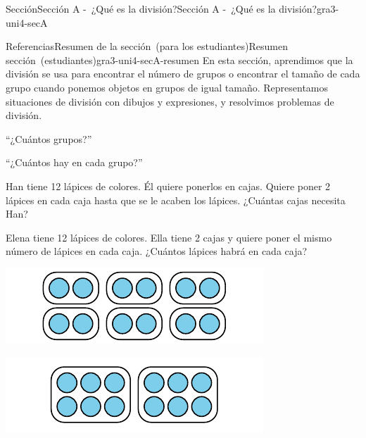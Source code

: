 \documentclass[oneside,10pt,]{article}
\begin{document}
\begin{sectionptx}{Sección}{Sección A -~¿Qué es la división?}{}{Sección A -~¿Qué es la división?}{}{}{gra3-uni4-secA}
\begin{references-subsection}{Referencias}{Resumen de la sección~(para los estudiantes)}{}{Resumen sección~(estudiantes)}{}{}{gra3-uni4-secA-resumen}
En esta sección, aprendimos que la división se usa para encontrar el número de grupos o encontrar el tamaño de cada grupo cuando ponemos objetos en grupos de igual tamaño. Representamos situaciones de división con dibujos y expresiones, y resolvimos problemas de división.%
\begin{sidebyside}{2}{0.025}{0.025}{0.05}%
\begin{sbspanel}{0.45}%
``¿Cuántos grupos?''%
\end{sbspanel}%
\begin{sbspanel}{0.45}%
\par
``¿Cuántos hay en cada grupo?''%
\end{sbspanel}%
\end{sidebyside}%
\begin{sidebyside}{2}{0.025}{0.025}{0.05}%
\begin{sbspanel}{0.45}%
Han tiene 12 lápices de colores. Él quiere ponerlos en cajas. Quiere poner 2 lápices en cada caja hasta que se le acaben los lápices. ¿Cuántas cajas necesita Han?%
\end{sbspanel}%
\begin{sbspanel}{0.45}%
\par
Elena tiene 12 lápices de colores. Ella tiene 2 cajas y quiere poner el mismo número de lápices en cada caja. ¿Cuántos lápices habrá en cada caja?%
\end{sbspanel}%
\end{sidebyside}%
\begin{sidebyside}{2}{0.025}{0.025}{0.05}%
\begin{sbspanel}{0.45}%
\includegraphics[width=\linewidth]{external/svg-source/tikz-file-147695.pdf}
\end{sbspanel}%
\begin{sbspanel}{0.45}%
\includegraphics[width=\linewidth]{external/svg-source/tikz-file-147696.pdf}

\end{sbspanel}
\end{sidebyside}
\end{references-subsection}
\end{sectionptx}
\end{document}
